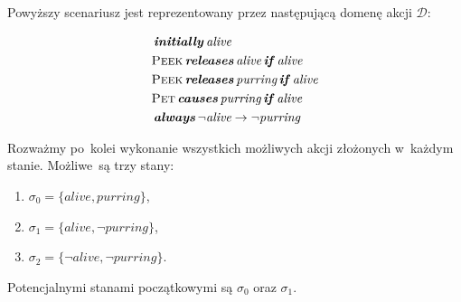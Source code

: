\documentclass[11pt,a4paper]{article}
\DeclareMathOperator{\Initially}{\textbf{\textit{initially}}}
\DeclareMathOperator{\Causes}{\textbf{\textit{causes}}}
\DeclareMathOperator{\If}{\textbf{\textit{if}}}
\DeclareMathOperator{\Releases}{\textbf{\textit{releases}}}
\DeclareMathOperator{\Always}{\textbf{\textit{always}}}
\begin{document}
Powyższy scenariusz jest reprezentowany przez następującą domenę akcji $\mathcal{D}$:

\begin{align*}
    & \Initially \textit{alive} \\
    & \textsc{Peek} \Releases \textit{alive} \If \textit{alive} \\
    & \textsc{Peek} \Releases \textit{purring} \If \textit{alive} \\
    & \textsc{Pet} \Causes \textit{purring} \If  \textit{alive} \\
    & \Always \neg \textit{alive} \rightarrow \neg \textit{purring}
\end{align*}

Rozważmy po~kolei wykonanie wszystkich możliwych akcji złożonych w~każdym stanie. Możliwe~są trzy stany:

\begin{enumerate}
    \item $\sigma_0 = \{ \textit{alive}, \textit{purring} \}$,
    \item $\sigma_1 = \{ \textit{alive}, \neg \textit{purring} \}$,
    \item $\sigma_2 = \{ \neg \textit{alive}, \neg \textit{purring} \}$.
\end{enumerate}

Potencjalnymi stanami początkowymi są $\sigma_0$ oraz $\sigma_1$.
\end{document}
